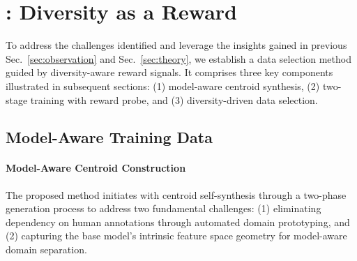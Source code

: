\section{\ours: Diversity as a Reward}
\label{sec:daar}
To address the challenges identified and leverage the insights gained in previous Sec.~\ref{sec:observation} and Sec.~\ref{sec:theory}, we establish a data selection method \ours guided by diversity-aware reward signals. 
It comprises three key components illustrated in subsequent sections: (1) model-aware centroid synthesis, (2) two-stage training with reward probe, and (3) diversity-driven data selection.

\subsection{Model-Aware Training Data}
\paragraph{Model-Aware Centroid Construction}
The proposed method initiates with centroid self-synthesis through a two-phase generation process to address two fundamental challenges: (1) eliminating dependency on human annotations through automated domain prototyping, and (2) capturing the base model's intrinsic feature space geometry for model-aware domain separation. 

